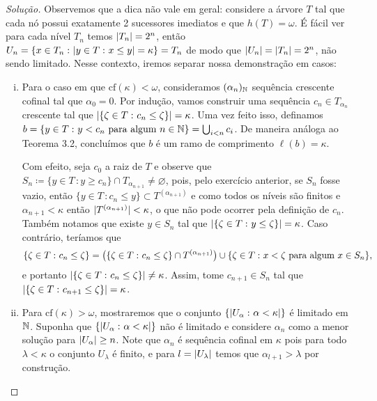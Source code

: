 \documentclass[a4paper]{article}
\begin{document}
\begin{proof}[Solução]
    Observemos que a dica não vale em geral: considere a árvore
    \(T\)  tal que cada nó possui exatamente 2 sucessores imediatos e que 
    \(h(T)=\omega\). É fácil ver para cada nível \(T_n\)  temos \(\vert T_n \vert=2^n\),
    então \(U_n=\{x\in T_n\,\colon\vert y\in T\,\colon x\leq y \vert=\kappa\} =T_n\)
      de modo que \(\vert U_n \vert=\vert T_n \vert=2^n\), não sendo limitado. Nesse
      contexto, iremos separar nossa demonstração em casos:
  \begin{enumerate}[(i)]
  \item Para o caso em que \(\text{cf}(\kappa)<\omega\), consideramos
    \((\alpha_n)_{\mathbb{N}}\)  sequência crescente cofinal tal que \(\alpha_0=0\).
      Por indução, vamos construir uma sequência \(c_n\in T_{\alpha_n}\) crescente tal que
      \(\vert \{\zeta\in T\,\colon c_n\leq\zeta\} \vert=\kappa\). Uma vez feito isso, definamos
      \(b=\{y\in T\,\colon y<c_n\text{ para algum
      }n\in\mathbb{N}\}=\bigcup_{i<n}c_i\). De maneira análoga ao Teorema 3.2,
      concluímos que \(b\) é um ramo de comprimento \(\ell(b)=\kappa\).
      
      Com efeito, seja \(c_0\) a raiz de \(T\) e observe que \mbox{\(S_n\coloneqq\{y\in
      T\,\colon y\geq c_n\}\cap T_{\alpha_{n+1}}\neq\varnothing\),}
      pois, pelo exercício anterior, se \(S_n\) fosse vazio, então
      \mbox{\(\{y\in T\,\colon c_n\leq y\}\subset T^{(\alpha_{n+1})}\)} e como todos os
      níveis são finitos e \(\alpha_{n+1}<\kappa\) então
      \(\vert T^{(\alpha_{n+1})} \vert<\kappa\), o que não pode ocorrer pela definição de
      \(c_n\). Também notamos que existe \(y\in S_n\) tal que
      \(\vert \{\zeta\in T\,\colon y\leq\zeta\} \vert=\kappa\). Caso contrário, teríamos que
      \[\{\zeta\in T\,\colon c_n\leq\zeta\}=\big(\{\zeta\in T\,\colon c_n\leq\zeta\}\cap T^{(\alpha_{n+1})}\big)\cup\{\zeta\in
      T\,\colon x <\zeta\text{ para
        algum }x\in S_n\},\] e portanto \(\vert \{\zeta\in T\,\colon c_n\leq\zeta\} \vert\neq\kappa\).
      Assim, tome \(c_{n+1}\in S_n\) tal que \(\vert \{\zeta\in T\,\colon c_{n+1}\leq\zeta\} \vert=\kappa\).

      \item Para \(\text{cf}(\kappa)>\omega\), mostraremos que o conjunto
      \(\{\vert U_\alpha\,\colon\alpha<\kappa \vert\}\) é limitado em \(\mathbb{N}\). Suponha que
      \mbox{\(\{\vert U_\alpha\,\colon\alpha<\kappa \vert\}\)} não é limitado e considere
      \(\alpha_n\) como a menor solução para
      \(\vert U_\alpha \vert\geq n\). Note que \(\alpha_n\) é sequência cofinal em \(\kappa\)
      pois para todo \(\lambda<\kappa\) o conjunto \(U_\lambda\) é finito, e para
      \(l=\vert U_\lambda \vert\) temos que \(\alpha_{l+1}>\lambda\) por construção.


\end{enumerate}
\end{proof}
\end{document}
